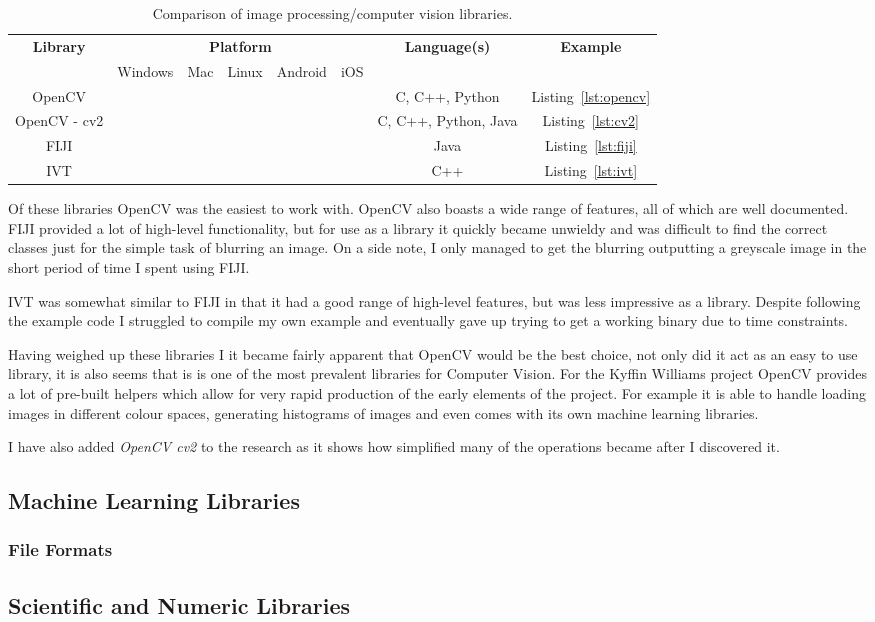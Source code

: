 \begin{table}[h]
\begin{tabular}{| c | c | c | c | c | c | c | c |}
								  \hline
\multirow{2}{*}{\textbf{Library}}	& \multicolumn{5}{|c|}{\textbf{Platform}}			& \multirow{2}{*}{\textbf{Language(s)}}	& \textbf{Example}	\\\cline{2-6}
					&  Windows	& Mac 		& Linux 	& Android	& iOS	&			&			\\\hline
OpenCV					& \checkmark	& \checkmark	& \checkmark	& 		& 	& C, C++, Python	& Listing~\ref{lst:opencv}\\\hline
OpenCV - cv2				& \checkmark	& \checkmark	& \checkmark	& \checkmark	& \checkmark & C, C++, Python, Java	& Listing~\ref{lst:cv2}\\\hline
FIJI					& \checkmark	& \checkmark	& \checkmark	& 		&	& Java			& Listing~\ref{lst:fiji}	\\\hline
IVT					& \checkmark	& \checkmark	& \checkmark	& 		&	& C++			& Listing~\ref{lst:ivt}	\\\hline
\end{tabular}
\caption{Comparison of image processing/computer vision libraries.}
\label{tab:libraries-overview}
\end{table}

Of these libraries OpenCV was the easiest to work with. OpenCV also boasts a wide range of 
features, all of which are well documented. FIJI provided a lot of high-level functionality, but
for use as a library it quickly became unwieldy and was difficult to find the correct classes just 
for the simple task of blurring an image. On a side note, I only managed to get the blurring 
outputting a greyscale image in the short period of time I spent using FIJI.

IVT was somewhat similar to FIJI in that it had a good range of high-level features, but was less
impressive as a library. Despite following the example code I struggled to compile my own example
and eventually gave up trying to get a working binary due to time constraints.


Having weighed up these libraries I it became fairly apparent that OpenCV would be the best choice,
not only did it act as an easy to use library, it is also seems that is is one of the most 
prevalent libraries for Computer Vision. For the Kyffin Williams project OpenCV provides a lot of
pre-built helpers which allow for very rapid production of the early elements of the project. For
example it is able to handle loading images in different colour spaces, generating histograms of
images and even comes with its own machine learning libraries.

I have also added \emph{OpenCV cv2} to the research as it shows how simplified many of the 
operations became after I discovered it.

\subsection{Machine Learning Libraries}

\subsubsection{File Formats}


\subsection{Scientific and Numeric Libraries}



